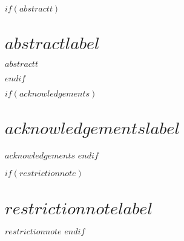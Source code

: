 
$if(abstractt)$
\cleardoublepage
\begin{minipage}{\linewidth}

	\chapter*{$abstractlabel$}
	$abstractt$

\end{minipage}
\cleardoublepage
$endif$



$if(acknowledgements)$
\chapter*{$acknowledgementslabel$}
$acknowledgements$
$endif$



$if(restrictionnote)$
\chapter*{$restrictionnotelabel$}
$restrictionnote$
$endif$



\cleardoublepage



\pagestyle{simple}
